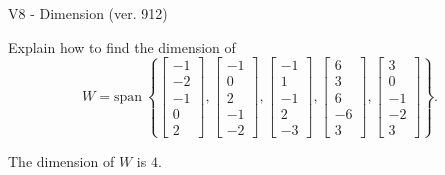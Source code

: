 \begin{exercise}
  \begin{exerciseTitle}V8 - Dimension (ver. 912)\end{exerciseTitle}
  \begin{exerciseStatement}
    Explain how to find the dimension of 
\[W=\mathrm{span}\ \left\{\left[\begin{array}{r}
-1 \\
-2 \\
-1 \\
0 \\
2
\end{array}\right] , \left[\begin{array}{r}
-1 \\
0 \\
2 \\
-1 \\
-2
\end{array}\right] , \left[\begin{array}{r}
-1 \\
1 \\
-1 \\
2 \\
-3
\end{array}\right] , \left[\begin{array}{r}
6 \\
3 \\
6 \\
-6 \\
3
\end{array}\right] , \left[\begin{array}{r}
3 \\
0 \\
-1 \\
-2 \\
3
\end{array}\right]\right\}.\]



  \end{exerciseStatement}
  \begin{exerciseAnswer}
   The dimension of \(W\) is  \(4\).
  


  \end{exerciseAnswer}
\end{exercise}